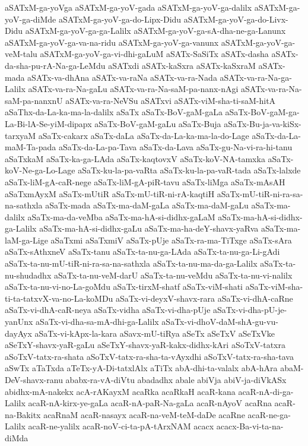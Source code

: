 {aSATxM-ga-yoVga
aSATxM-ga-yoV-gada
aSATxM-ga-yoV-ga-dalilx
aSATxM-ga-yoV-ga-diMde
aSATxM-ga-yoV-ga-do-Lipx-Didu
aSATxM-ga-yoV-ga-do-Livx-Didu
aSATxM-ga-yoV-ga-ga-Lalilx
aSATxM-ga-yoV-ga-sA-dha-ne-ga-Lanunx
aSATxM-ga-yoV-ga-va-na-ridu
aSATxM-ga-yoV-ga-vanunx
aSATxM-ga-yoV-ga-veM-talu
aSATxM-ga-yoV-ga-vi-dhi-gaLuM
aSATx-SaSiTx
aSATx-dasha
aSATx-da-sha-pu-rA-Na-ga-LeMdu
aSATxdi
aSATx-kaSxra
aSATx-kaSxraM
aSATx-mada
aSATx-va-dhAna
aSATx-va-raNa
aSATx-va-ra-Nada
aSATx-va-ra-Na-ga-Lalilx
aSATx-va-ra-Na-gaLu
aSATx-va-ra-Na-saM-pa-nanx-nAgi
aSATx-va-ra-Na-saM-pa-nanxnU
aSATx-va-ra-NeVSu
aSATxvi
aSATx-viM-sha-ti-saM-hitA
aSaThx-da-La-ka-ma-la-dalilx
aSaTx
aSaTx-BoV-gaM-gaLa
aSaTx-BoV-gaM-ga-La-Bi-lA-Se-yiM-dipapx
aSaTx-BoV-gaM-gaLu
aSaTx-Buja
aSaTx-Bu-ja-va-kiSx-tarxyaM
aSaTx-cakarx
aSaTx-daLa
aSaTx-da-La-ka-ma-la-do-Lage
aSaTx-da-La-maM-Ta-pada
aSaTx-da-La-pa-Tava
aSaTx-da-Lava
aSaTx-gu-Na-vi-ra-hi-tanu
aSaTxkaM
aSaTx-ka-ga-LAda
aSaTx-kaqtovxV
aSaTx-koV-NA-tamxka
aSaTx-koV-Ne-ga-Lo-Lage
aSaTx-ku-la-pa-vaRta
aSaTx-ku-la-pa-vaR-tada
aSaTx-lalxde
aSaTx-liM-gA-caR-nege
aSaTx-liM-gA-piR-tavu
aSaTx-liMga
aSaTx-mAsAH
aSaTxmAyxM
aSaTx-mUtiR
aSaTx-mU-tiR-ni-rA-kaqtiH
aSaTx-mU-tiR-ni-ra-sa-na-sathxla
aSaTx-mada
aSaTx-ma-daM-gaLa
aSaTx-ma-daM-gaLu
aSaTx-ma-dalilx
aSaTx-ma-da-veMba
aSaTx-ma-hA-si-didhx-gaLaM
aSaTx-ma-hA-si-didhx-ga-Lalilx
aSaTx-ma-hA-si-didhx-gaLu
aSaTx-ma-ha-deY-shavx-yaRva
aSaTx-ma-laM-ga-Lige
aSaTxmi
aSaTxmiV
aSaTx-pUje
aSaTx-ra-ma-TiTxge
aSaTx-sAra
aSaTx-sAthxneV
aSaTx-tanu
aSaTx-ta-nu-ga-LAda
aSaTx-ta-nu-ga-Li-gAdi
aSaTx-ta-nu-mU-tiR-ni-ra-sa-na-sathxla
aSaTx-ta-nu-ma-da-ga-Lalilx
aSaTx-ta-nu-shudadhx
aSaTx-ta-nu-veM-darU
aSaTx-ta-nu-veMdu
aSaTx-ta-nu-vi-nalilx
aSaTx-ta-nu-vi-no-La-goMdu
aSaTx-tirxM-shatf
aSaTx-viM-shati
aSaTx-viM-sha-ti-ta-tatxvX-va-no-La-koMDu
aSaTx-vi-deyxV-shavx-rara
aSaTx-vi-dhA-caRne
aSaTx-vi-dhA-caR-neya
aSaTx-vidha
aSaTx-vi-dha-pUje
aSaTx-vi-dha-pU-je-yanUnx
aSaTx-vi-dha-sa-mA-dhi-ga-Lalilx
aSaTx-vi-dhoV-daM-shA-gu-vu-dayAyx
aSaTx-vi-kApx-la-kara
aSavx-mU-tiRya
aSeTx
aSeTxV
aSeTxVke
aSeTxY-shavx-yaR-gaLu
aSeTxY-shavx-yaR-kakx-didhx-kAri
aSoTxV-tatxra
aSoTxV-tatx-ra-shata
aSoTxV-tatx-ra-sha-ta-vAyxdhi
aSoTxV-tatx-ra-sha-tava
aSwTx
aTaTxda
aTeTx-yA-Di-tatxlAlx
aTiTx
abA-dhi-ta-valalx
abA-hAra
abaM-DeV-shavx-ranu
ababx-ra-vA-diVtu
abadadhx
abale
abiVja
abiV-ja-diVkASx
abidhx-mA-nakekx
acA-rAKayxM
acaRka
acaRkaH
acaR-kana
acaR-nA-di-ga-Lalilx
acaR-nA-kirx-ye-gaLa
acaR-nA-paR-Na-gaLa
acaR-nAyoV
acaRna
acaR-na-Bakitx
acaRnaM
acaR-nasayx
acaR-na-veM-teM-daDe
acaRne
acaR-ne-ga-Lalilx
acaR-ne-yalilx
acaR-noV-ci-ta-pA-tArxNAM
acacx
acacx-Ba-vi-ta-na-diMda
}
